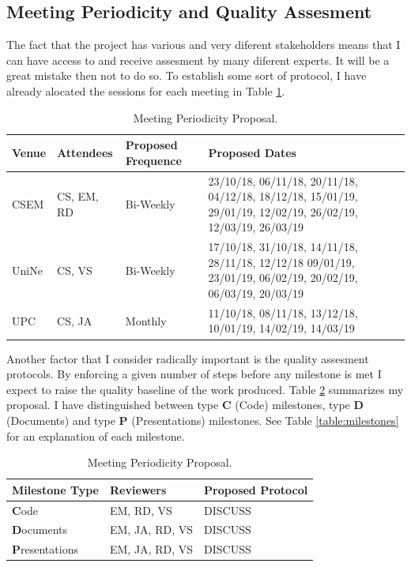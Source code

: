 \documentclass{article}
\begin{document}
\subsection{Meeting Periodicity and Quality Assesment}

The fact that the project has various and very diferent stakeholders means that I can have access to and receive assesment by many diferent experts. It will be a great mistake then not to do so. To establish some sort of protocol, I have already alocated the sessions for each meeting in Table \ref{table:meeting-periodicity}.
\begin{table}[h!]
\centering
\begin{tabular}{lllp{8cm}}
\hline
\textbf{Venue} & \textbf{Attendees} & \textbf{Proposed Frequence} & \textbf{Proposed Dates} \\[3pt]
\hline \hline
CSEM & CS, EM, RD & Bi-Weekly & 23/10/18, 06/11/18, 20/11/18, 04/12/18, 18/12/18, 15/01/19, 29/01/19, 12/02/19, 26/02/19, 12/03/19, 26/03/19 \\[3pt]
UniNe & CS, VS & Bi-Weekly & 17/10/18, 31/10/18, 14/11/18, 28/11/18, 12/12/18 09/01/19, 23/01/19, 06/02/19, 20/02/19, 06/03/19, 20/03/19 \\[3pt]
UPC & CS, JA & Monthly & 11/10/18, 08/11/18, 13/12/18, 10/01/19, 14/02/19, 14/03/19 \\[3pt]
\hline
\end{tabular}
\caption{Meeting Periodicity Proposal. \label{table:meeting-periodicity}}
\end{table}

Another factor that I consider radically important is the quality assesment protocols. By enforcing a given number of steps before any milestone is met I expect to raise the quality baseline of the work produced. Table \ref{table:quality-assesment} summarizes my proposal. I have distinguished between type \textbf{C} (Code) milestones, type \textbf{D} (Documents) and type \textbf{P} (Presentations) milestones. See Table \ref{table:milestones} for an explanation of each milestone.
\begin{table}[h!]
\centering
\begin{tabular}{lll}
\hline
\textbf{Milestone Type} & \textbf{Reviewers} & \textbf{Proposed Protocol} \\[3pt]
\hline \hline
\textbf{C}ode & EM, RD, VS & DISCUSS \\[3pt]
\textbf{D}ocuments & EM, JA, RD, VS & DISCUSS \\[3pt]
\textbf{P}resentations & EM, JA, RD, VS & DISCUSS \\[3pt]
\hline
\end{tabular}
\caption{Meeting Periodicity Proposal. \label{table:quality-assesment}}
\end{table}
\end{document}
